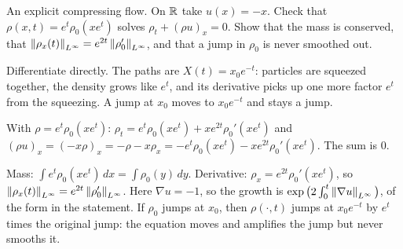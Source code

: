 \begin{exercise}
  An explicit compressing flow. On $\mathbb{R}$ take $u(x) = -x$. Check that $\rho(x,t) = e^t\rho_0(xe^t)$ solves $\rho_t + (\rho u)_x = 0$. Show that the mass is conserved, that $\left\lVert \rho_x(t)\right\rVert_{L^\infty} = e^{2t}\left\lVert \rho_0'\right\rVert_{L^\infty}$, and that a jump in $\rho_0$ is never smoothed out.
  \begin{hint}
    Differentiate directly. The paths are $X(t) = x_0e^{-t}$: particles are squeezed together, the density grows like $e^t$, and its derivative picks up one more factor $e^t$ from the squeezing. A jump at $x_0$ moves to $x_0e^{-t}$ and stays a jump.
  \end{hint}
  \begin{solution}
    With $\rho = e^t\rho_0(xe^t)$: $\rho_t = e^t\rho_0(xe^t) + xe^{2t}\rho_0'(xe^t)$ and $(\rho u)_x = (-x\rho)_x = -\rho - x\rho_x = -e^t\rho_0(xe^t) - xe^{2t}\rho_0'(xe^t)$. The sum is $0$.

    Mass: $\int e^t\rho_0(xe^t)\,dx = \int\rho_0(y)\,dy$. Derivative: $\rho_x = e^{2t}\rho_0'(xe^t)$, so $\left\lVert \rho_x(t)\right\rVert_{L^\infty} = e^{2t}\left\lVert \rho_0'\right\rVert_{L^\infty}$. Here $\nabla u = -1$, so the growth is $\exp\big(2\int_0^t\left\lVert \nabla u\right\rVert_{L^\infty}\big)$, of the form in the statement. If $\rho_0$ jumps at $x_0$, then $\rho(\cdot,t)$ jumps at $x_0e^{-t}$ by $e^t$ times the original jump: the equation moves and amplifies the jump but never smooths it.
  \end{solution}
\end{exercise}

